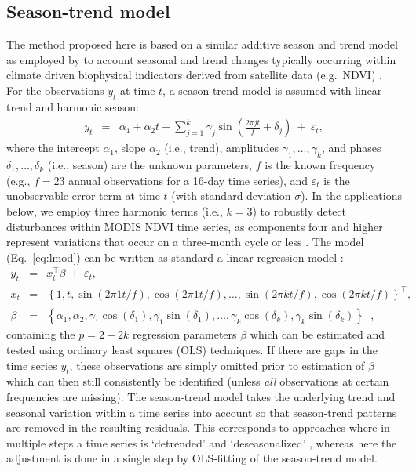 \documentclass[authoryear,preprint,review,10pt]{elsarticle}
\begin{document}
\subsection{Season-trend model}\label{sec:seasontrendmodel}

The method proposed here is based on a similar additive season and trend model as employed by \citet{Verbesselt:2010wo} to account seasonal and trend changes typically occurring within climate driven biophysical indicators derived from satellite data (e.g.\ NDVI)  \citep{Beurs2005a}. For the observations $y_t$ at time $t$, a season-trend model is assumed with linear trend and harmonic season:
%
\begin{eqnarray} \label{eq:lmod}
  y_t & = & \alpha_1 + \alpha_2 t + \sum_{j = 1}^k \gamma_{j} \sin \left(\frac{2\pi j t}{f} + \delta_{j} \right) ~+~ \varepsilon_t,
\end{eqnarray}
%
where the intercept $\alpha_1$, slope $\alpha_2$ (i.e., trend), amplitudes $\gamma_1, \dots, \gamma_k$,
and phases $\delta_1, \dots, \delta_k$ (i.e., season) are the unknown parameters,
$f$ is the known frequency (e.g., $f = 23$ annual observations for a 16-day time series),
and $\varepsilon_t$ is the unobservable error term at time $t$ (with standard deviation $\sigma$). In the applications
below, we employ three harmonic terms (i.e., $k = 3$) to robustly detect disturbances within MODIS NDVI time series, as components four and higher represent variations
that occur on a three-month cycle or less \citep{Geerken2009,Julien2010}. The model (Eq.~\ref{eq:lmod}) can be written as standard a linear regression model \citep[see e.g.,][Chapter~3.3]{Cryer2008}:
%
\begin{eqnarray*} \label{eq:OLSlmod}
  y_t   & = & x_t^\top \beta ~+~ \varepsilon_t, \\
  x_t   & = & \left\{1, t, \sin(2 \pi 1 t / f), \cos(2 \pi 1 t / f),
              \dots, \sin(2 \pi k t / f), \cos(2 \pi k t / f)\right\}^\top, \\
  \beta & = & \left\{\alpha_1, \alpha_2, \gamma_1 \cos(\delta_1), \gamma_1 \sin(\delta_1),
              \dots, \gamma_k \cos(\delta_k), \gamma_k \sin(\delta_k)\right\}^\top,
\end{eqnarray*}
%
containing the $p = 2 + 2 k$ regression parameters $\beta$ which can be estimated and tested using ordinary least squares (OLS) techniques. 
If there are gaps in the time series $y_t$, these observations are simply omitted prior to estimation of $\beta$ which can then still consistently 
be identified (unless \emph{all} observations at certain frequencies are missing). The season-trend model takes the underlying trend and seasonal variation within a time series into account so that season-trend patterns are removed in the resulting residuals. This corresponds to approaches where in multiple steps a time series is `detrended' and `deseasonalized' \citep[e.g.][]{Potter2003}, whereas here the adjustment is done in a single step by OLS-fitting of the season-trend model.
\end{document}
